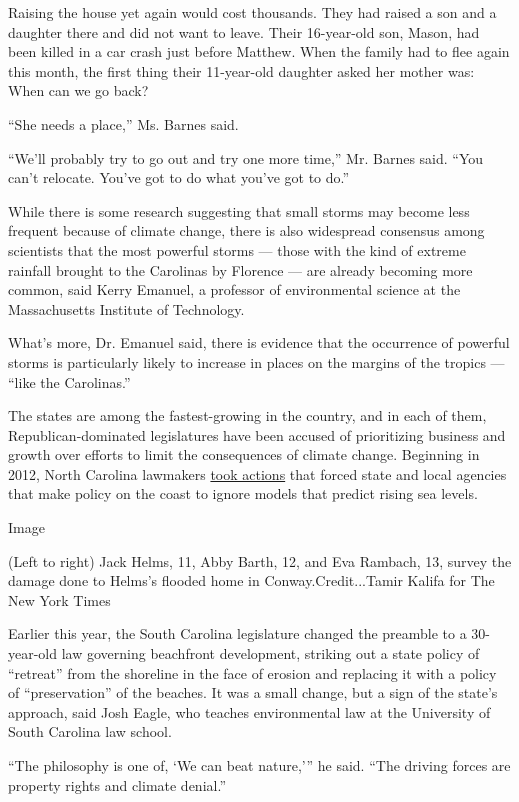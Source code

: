 Raising the house yet again would cost thousands. They had raised a son
and a daughter there and did not want to leave. Their 16-year-old son,
Mason, had been killed in a car crash just before Matthew. When the
family had to flee again this month, the first thing their 11-year-old
daughter asked her mother was: When can we go back?

``She needs a place,'' Ms. Barnes said.

``We'll probably try to go out and try one more time,'' Mr. Barnes said.
``You can't relocate. You've got to do what you've got to do.''

While there is some research suggesting that small storms may become
less frequent because of climate change, there is also widespread
consensus among scientists that the most powerful storms --- those with
the kind of extreme rainfall brought to the Carolinas by Florence ---
are already becoming more common, said Kerry Emanuel, a professor of
environmental science at the Massachusetts Institute of Technology.

What's more, Dr. Emanuel said, there is evidence that the occurrence of
powerful storms is particularly likely to increase in places on the
margins of the tropics --- ``like the Carolinas.''

The states are among the fastest-growing in the country, and in each of
them, Republican-dominated legislatures have been accused of
prioritizing business and growth over efforts to limit the consequences
of climate change. Beginning in 2012, North Carolina lawmakers
\href{https://www.nytimes.com/2018/09/12/us/north-carolina-coast-hurricane.html}{took
actions} that forced state and local agencies that make policy on the
coast to ignore models that predict rising sea levels.

Image

(Left to right) Jack Helms, 11, Abby Barth, 12, and Eva Rambach, 13,
survey the damage done to Helms's flooded home in Conway.Credit...Tamir
Kalifa for The New York Times

Earlier this year, the South Carolina legislature changed the preamble
to a 30-year-old law governing beachfront development, striking out a
state policy of ``retreat'' from the shoreline in the face of erosion
and replacing it with a policy of ``preservation'' of the beaches. It
was a small change, but a sign of the state's approach, said Josh Eagle,
who teaches environmental law at the University of South Carolina law
school.

``The philosophy is one of, `We can beat nature,''' he said. ``The
driving forces are property rights and climate denial.''

